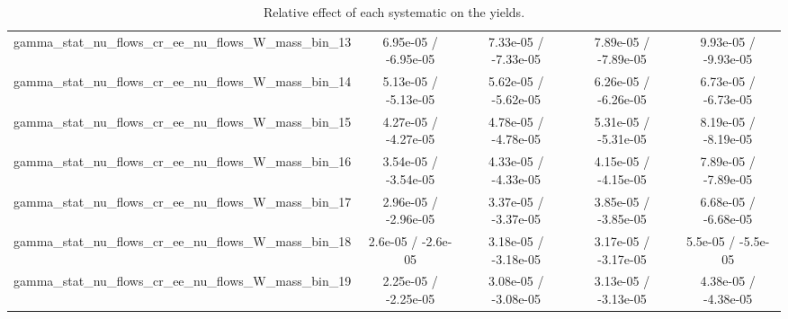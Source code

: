 \documentclass[10pt]{article}
\begin{document}
\begin{table}[htbp]
\begin{center}
\begin{tabular}{|c|c|c|c|c|}
  gamma_stat_nu_flows_cr_ee_nu_flows_W_mass_bin_13 & 6.95e-05 / -6.95e-05 & 7.33e-05 / -7.33e-05 & 7.89e-05 / -7.89e-05 & 9.93e-05 / -9.93e-05 \\ 
  gamma_stat_nu_flows_cr_ee_nu_flows_W_mass_bin_14 & 5.13e-05 / -5.13e-05 & 5.62e-05 / -5.62e-05 & 6.26e-05 / -6.26e-05 & 6.73e-05 / -6.73e-05 \\ 
  gamma_stat_nu_flows_cr_ee_nu_flows_W_mass_bin_15 & 4.27e-05 / -4.27e-05 & 4.78e-05 / -4.78e-05 & 5.31e-05 / -5.31e-05 & 8.19e-05 / -8.19e-05 \\ 
  gamma_stat_nu_flows_cr_ee_nu_flows_W_mass_bin_16 & 3.54e-05 / -3.54e-05 & 4.33e-05 / -4.33e-05 & 4.15e-05 / -4.15e-05 & 7.89e-05 / -7.89e-05 \\ 
  gamma_stat_nu_flows_cr_ee_nu_flows_W_mass_bin_17 & 2.96e-05 / -2.96e-05 & 3.37e-05 / -3.37e-05 & 3.85e-05 / -3.85e-05 & 6.68e-05 / -6.68e-05 \\ 
  gamma_stat_nu_flows_cr_ee_nu_flows_W_mass_bin_18 & 2.6e-05 / -2.6e-05 & 3.18e-05 / -3.18e-05 & 3.17e-05 / -3.17e-05 & 5.5e-05 / -5.5e-05 \\ 
  gamma_stat_nu_flows_cr_ee_nu_flows_W_mass_bin_19 & 2.25e-05 / -2.25e-05 & 3.08e-05 / -3.08e-05 & 3.13e-05 / -3.13e-05 & 4.38e-05 / -4.38e-05 \\ 
\hline 
\end{tabular} 
\caption{Relative effect of each systematic on the yields.} 
\end{center} 
\end{table} 
\end{document}
